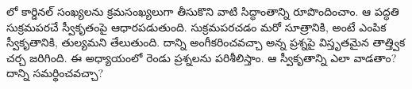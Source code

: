 \documentclass[../../../include/open-logic-section]{subfiles}
\begin{document}


లో
కార్డినల్ సంఖ్యలను క్రమసంఖ్యలుగా తీసుకొని వాటి
సిద్ధాంతాన్ని రూపొందించాం. ఆ పద్ధతి సుక్రమపరచే
స్వీకృతంపై ఆధారపడుతుంది. సుక్రమపరచడం మరో సూత్రానికి,
అంటే ఎంపిక స్వీకృతానికి, తుల్యమని తేలుతుంది.
దాన్ని అంగీకరించవచ్చా అన్న ప్రశ్నపై విస్తృతమైన తాత్త్విక చర్చ
జరిగింది. ఈ అధ్యాయంలో రెండు ప్రశ్నలను పరిశీలిస్తాం.
ఆ స్వీకృతాన్ని ఎలా వాడతాం? దాన్ని సమర్థించవచ్చా?
\end{document}
